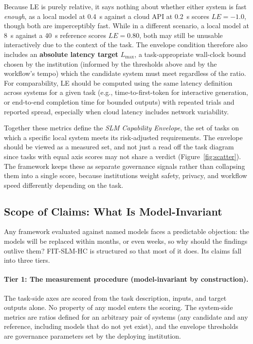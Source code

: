 \documentclass[11pt]{article}
\begin{document}
Because LE is purely relative, it says nothing about whether either system is fast \emph{enough}, as a local model at 0.4~s against a cloud API at 0.2~s scores $LE = -1.0$, though both are imperceptibly fast. While in a different scenario, a local model at 8~s against a 40~s reference scores $LE = 0.80$, both may still be unusable interactively due to the context of the task. The envelope condition therefore also includes an \textbf{absolute latency target} $L_{\max}$, a task-appropriate wall-clock bound chosen by the institution (informed by the thresholds above and by the workflow's tempo) which the candidate system must meet regardless of the ratio. For comparability, LE should be computed using the same latency definition across systems for a given task (e.g., time-to-first-token for interactive generation, or end-to-end completion time for bounded outputs) with repeated trials and reported spread, especially when cloud latency includes network variability.

Together these metrics define the \emph{SLM Capability Envelope}, the set of tasks on which a specific local system meets its risk-adjusted requirements. The envelope should be viewed as a measured set, and not just a read off the task diagram since tasks with equal axis scores may not share a verdict (Figure~\ref{fig:scatter}). The framework keeps these as separate governance signals rather than collapsing them into a single score, because institutions weight safety, privacy, and workflow speed differently depending on the task.

\subsection{Scope of Claims: What Is Model-Invariant}
\label{sec:scope}

Any framework evaluated against named models faces a predictable objection: the models will be replaced within months, or even weeks, so why should the findings outlive them? FIT-SLM-HC is structured so that most of it does. Its claims fall into three tiers.

\paragraph{Tier 1: The measurement procedure (model-invariant by construction).}
The task-side axes are scored from the task description, inputs, and target outputs alone. No property of any model enters the scoring. The system-side metrics are ratios defined for an arbitrary pair of systems (any candidate and any reference, including models that do not yet exist), and the envelope thresholds are governance parameters set by the deploying institution.
\end{document}
